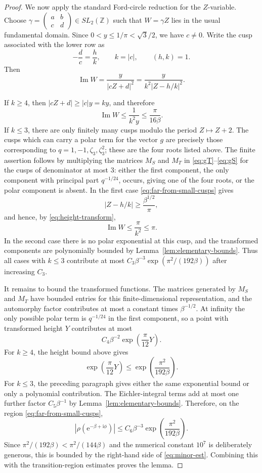 \documentclass[10pt,a4paper]{amsart}
\newcommand{\ii}{\mathrm i}
\newcommand{\e}{\mathrm e}
\newcommand{\Z}{\mathbb Z}
\newcommand{\Impart}{\operatorname{Im}}
\begin{document}
\begin{proof}
We now apply the standard Ford-circle reduction for the $Z$-variable.  Choose
$\gamma=\begin{pmatrix}a&b\\ c&d\end{pmatrix}\in SL_2(\Z)$ such that
$W=\gamma Z$ lies in the usual fundamental domain.  Since $0<y\leq1/\pi<\sqrt3/2$, we have
$c\neq0$.  Write the cusp associated with the lower row as
\[
-\frac{d}{c}=\frac{h}{k},
\qquad k=|c|,
\qquad (h,k)=1.
\]
Then
\begin{equation}\label{eq:height-transform}
\Impart W=\frac{y}{|cZ+d|^2}=\frac{y}{k^2|Z-h/k|^2}.
\end{equation}

If $k\geq4$, then $|cZ+d|\geq |c|y=ky$, and therefore
\[
\Impart W\leq \frac{1}{k^2y}\leq \frac{\pi}{16\beta}.
\]
If $k\leq3$, there are only finitely many cusps modulo the period $Z\mapsto Z+2$.  The cusps
which can carry a polar term for the vector $g$ are precisely those corresponding to
$q=1,-1,\zeta_3,\zeta_3^2$; these are the four roots listed above.  The finite assertion follows
by multiplying the matrices $M_S$ and $M_T$ in \eqref{eq:gT}--\eqref{eq:gS} for the cusps of
denominator at most $3$: either the first component, the only component with principal part
$q^{-1/24}$, occurs, giving one of the four roots, or the polar component is absent.  In the
first case \eqref{eq:far-from-small-cusps} gives
\[
|Z-h/k|\geq \frac{\beta^{1/2}}{\pi},
\]
and hence, by \eqref{eq:height-transform},
\[
\Impart W\leq \frac{\pi}{k^2}\leq\pi.
\]
In the second case there is no polar exponential at this cusp, and the transformed components
are polynomially bounded by Lemma~\ref{lem:elementary-bounds}.  Thus all cases with
$k\leq3$ contribute at most $C_3\beta^{-3}\exp(\pi^2/(192\beta))$ after increasing $C_3$.

It remains to bound the transformed functions.  The matrices generated by $M_S$ and $M_T$
have bounded entries for this finite-dimensional representation, and the automorphy factor
contributes at most a constant times $\beta^{-1/2}$.  At infinity the only possible polar term is
$q^{-1/24}$ in the first component, so a point with transformed height $Y$ contributes at most
\[
C_4\beta^{-2}\exp\left(\frac{\pi}{12}Y\right).
\]
For $k\geq4$, the height bound above gives
\[
\exp\left(\frac{\pi}{12}Y\right)
\leq
\exp\left(\frac{\pi^2}{192\beta}\right).
\]
For $k\leq3$, the preceding paragraph gives either the same exponential bound or only a
polynomial contribution.  The Eichler-integral terms add at most one further factor
$C_5\beta^{-1}$ by Lemma~\ref{lem:elementary-bounds}.  Therefore, on the region
\eqref{eq:far-from-small-cusps},
\[
|\rho(\e^{-\beta+\ii\phi})|
\leq
C_6\beta^{-3}\exp\left(\frac{\pi^2}{192\beta}\right).
\]
Since $\pi^2/(192\beta)<\pi^2/(144\beta)$ and the numerical constant $10^7$ is deliberately
generous, this is bounded by the right-hand side of \eqref{eq:minor-est}.  Combining this with
the transition-region estimates proves the lemma.
\end{proof}
\end{document}
